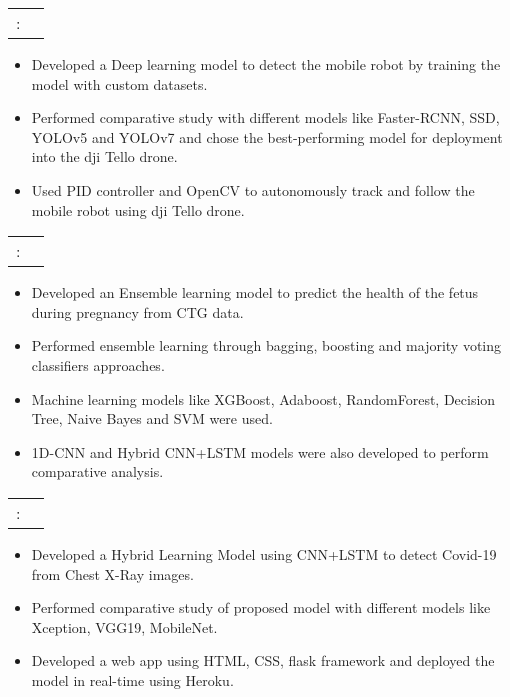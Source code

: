 \documentclass[a4paper,11pt]{article}
\makeatletter
\newcommand{\resumeItem}[1]{
  \item\small{\vspace{-2pt}}
}
\newcommand{\resumeProject}[2]{
\vspace{0.5mm}\item[]
    \begin{tabular*}{\textwidth}[t]{l@{\extracolsep{\fill}}r}
    \hspace{-3mm}{#1}:\hspace{1mm} & \hspace*{0pt}\hfill{\footnotesize{ #2}} \vspace{-0.5mm}\\ 
    \end{tabular*}
}
\newcommand{\resumeItemListStart}{\begin{itemize}}
\newcommand{\resumeItemListEnd}{\end{itemize}\vspace{-5pt}}
\makeatother
\begin{document}
    \vspace{-15pt}
    \resumeProject{\textbf{\href{https://github.com/Jkanishkha0305/Visual-Tracking-of-Mobile-Robots-using-UAV}{Application of DCNN for Visual Tracking of Mobile Robots using UAV}}{\hspace{0.2mm} \faGithub}}
	{\raisebox{0.75pt}{Dec. 2022}}
      \resumeItemListStart
        \resumeItem{}
          {Developed a Deep learning model to detect the mobile robot by training the model with custom datasets.}
        \resumeItem{}
          {Performed comparative study with different models like Faster-RCNN, SSD, YOLOv5 and YOLOv7 and chose the best-performing model for deployment into the dji Tello drone.}
        \resumeItem{}
          {Used PID controller and OpenCV to autonomously track and follow the mobile robot using dji Tello drone.}

      \resumeItemListEnd
 
    \vspace{-15pt}    
    \resumeProject{\textbf{\href{https://github.com/Jkanishkha0305/Fetal-Health-prediction-from-CTG-Data-using-Ensemble-learning}{Fetal Health prediction from CTG Data using Ensemble learning}}{\hspace{0.2mm} \faGithub}}
	{\raisebox{0.75pt}{Sep. 2022}}
      \resumeItemListStart
        \resumeItem{}
          {Developed an Ensemble learning model to predict the health of the fetus during pregnancy from CTG data.}
        \resumeItem{}
          {Performed ensemble learning through bagging, boosting and majority voting classifiers approaches.}
        \resumeItem{}
          {Machine learning models like XGBoost, Adaboost, RandomForest, Decision Tree, Naive Bayes and  SVM were used.}
        \resumeItem{}
          {1D-CNN and Hybrid CNN+LSTM models were also developed to perform comparative analysis.}
      \resumeItemListEnd
      
    \vspace{-15pt}    
	\resumeProject{\textbf{\href{https://github.com/Jkanishkha0305/Detection-of-Covid-19-from-Chest-Xray-using-Custom-CNN-and-Transfer-Learning}{End-to-End Model to detect Covid-19 from Chest X-ray Images}}{\hspace{0.2mm} \faGithub}}
	{\raisebox{0.75pt}{Mar. 2022}}
      \resumeItemListStart
        \resumeItem{}
          {Developed a Hybrid Learning Model using CNN+LSTM to detect Covid-19 from Chest X-Ray images.}
        \resumeItem{}
          {Performed comparative study of proposed model with different models like Xception, VGG19, MobileNet.}
        \resumeItem{}
          {Developed a web app using HTML, CSS, flask framework and deployed the model in real-time using Heroku.}  
      \resumeItemListEnd
 
\end{document}
